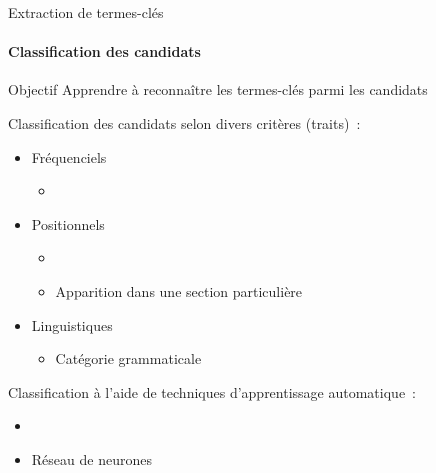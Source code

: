   \begin{frame}{Extraction de termes-clés}\framesubtitle{Classification des candidats}
    \begin{block}{Objectif}
      Apprendre à reconnaître les termes-clés parmi les candidats
    \end{block}

    \vspace{1em}

    Classification des candidats selon divers critères (traits)~:
    \begin{itemize}
      \item{Fréquenciels}
      \begin{itemize}
        \item{}
      \end{itemize}
      \item{Positionnels}
      \begin{itemize}
        \item{}
        \item{Apparition dans une section
              particulière~\cite{nguyen2007keadocumentstructure}}
      \end{itemize}
      \item{Linguistiques}
      \begin{itemize}
        \item{Catégorie grammaticale~\cite{nguyen2007keadocumentstructure}}
      \end{itemize}
    \end{itemize}

    \vspace{1em}

    Classification à l'aide de techniques d'apprentissage automatique~:
    \begin{itemize}
      \item{}
      \item{Réseau de neurones~\cite{sarkar2010neuralnetwork}}
    \end{itemize}
  \end{frame}

